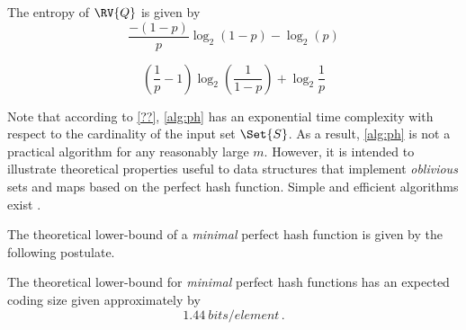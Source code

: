 \documentclass[ ../main.tex]{subfiles}
\begin{document}
The entropy of $\RV{Q}$ is given by
\begin{equation}
    \frac{-(1-p)}{p} \log_2(1 - p) - \log_2(p)
\end{equation}

\begin{equation}
    \left(\frac{1}{p}-1\right) \log_2\!\left(\frac{1}{1 - p}\right) + \log_2\frac{1}{p}
\end{equation}


Note that according to \cref{??}, \cref{alg:ph} has an exponential time 
complexity with respect to the cardinality of the input set $\Set{S}$. As a 
result, \cref{alg:ph} is not a practical algorithm for any reasonably large 
$m$. However, it is intended to illustrate theoretical properties useful to 
data structures that implement \emph{oblivious} sets and maps\cite{phf,pmf} 
based on the perfect hash function. Simple and efficient algorithms exist 
\cite{chd,simple}. 

The theoretical lower-bound of a \emph{minimal} perfect hash function is given by the following postulate.
\begin{postulate}
\label{pst:lb}
The theoretical lower-bound for \emph{minimal} perfect hash functions has an expected coding size given approximately by
\begin{equation}
\label{eq:low_bound}
    \SI{1.44}{bits \per element}\,.
\end{equation}
\end{postulate}
\end{document}
